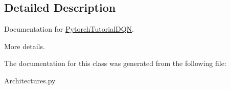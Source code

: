 \subsection{Detailed Description}
Documentation for \mbox{\hyperlink{classArchitectures_1_1PytorchTutorialDQN}{Pytorch\+Tutorial\+D\+QN}}. 

More details. 

The documentation for this class was generated from the following file\+:\begin{DoxyCompactItemize}
\item 
Architectures.\+py\end{DoxyCompactItemize}
